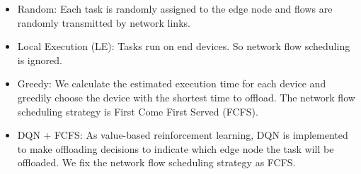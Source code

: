 \documentclass[10pt, conference, letterpaper]{IEEEtran}
\begin{document}
\begin{itemize}
    \item Random: Each task is randomly assigned to the edge node and flows are randomly transmitted by network links.
    
    \item Local Execution (LE): Tasks run on end devices. So network flow scheduling is ignored.
    
    \item Greedy: We calculate the estimated execution time for each device and greedily choose the device with the shortest time to offload. The network flow scheduling strategy is First Come First Served (FCFS).
    \item DQN + FCFS:  As value-based reinforcement learning, DQN is implemented to make offloading decisions to indicate which edge node the task will be offloaded. We fix the network flow scheduling strategy as FCFS.
    
    
\end{itemize}
\end{document}
